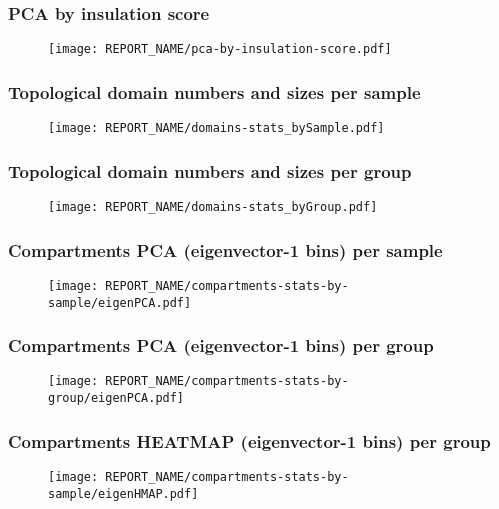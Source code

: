 \documentclass{beamer}
\begin{document}

\begin{frame}
\frametitle{PCA by insulation score}
\begin{figure}
\texttt{[image: REPORT\_NAME/pca-by-insulation-score.pdf]}
\end{figure}
\end{frame}


\begin{frame}
\frametitle{Topological domain numbers and sizes per sample}
\begin{figure}
\texttt{[image: REPORT\_NAME/domains-stats\_bySample.pdf]}
\end{figure}
\end{frame}


\begin{frame}
\frametitle{Topological domain numbers and sizes per group}
\begin{figure}
\texttt{[image: REPORT\_NAME/domains-stats\_byGroup.pdf]}
\end{figure}
\end{frame}


\begin{frame}
\frametitle{Compartments PCA (eigenvector-1 bins) per sample}
\begin{figure}
\texttt{[image: REPORT\_NAME/compartments-stats-by-sample/eigenPCA.pdf]}
\end{figure}
\end{frame}


\begin{frame}
\frametitle{Compartments PCA (eigenvector-1 bins) per group}
\begin{figure}
\texttt{[image: REPORT\_NAME/compartments-stats-by-group/eigenPCA.pdf]}
\end{figure}
\end{frame}


\begin{frame}
\frametitle{Compartments HEATMAP (eigenvector-1 bins) per group}
\begin{figure}
\texttt{[image: REPORT\_NAME/compartments-stats-by-sample/eigenHMAP.pdf]}
\end{figure}
\end{frame}
\end{document}
